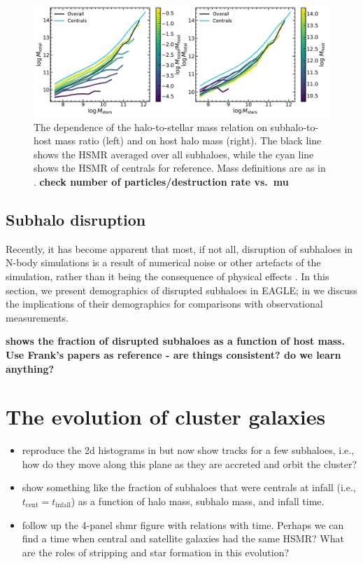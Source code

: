 \documentclass[usenatbib,fleqn]{mnras}
\newcommand{\comment}[1]{\textbf{\color{magenta} #1}}
\newcommand{\eagle}{EAGLE}
\newcommand{\tcent}{t_\mathrm{cent}}
\newcommand{\tinfall}{t_\mathrm{infall}}
\begin{document}
\begin{figure}
  \centerline{\includegraphics[width=\linewidth]{shmr_mu.pdf}}
  \caption{The dependence of the halo-to-stellar mass relation on subhalo-to-host mass ratio (left) and on host halo mass (right). The black line shows the HSMR averaged over all subhaloes, while the cyan line shows the HSMR of centrals for reference. Mass definitions are as in . \comment{check number of particles/destruction rate vs.\ mu}}
  \label{f:shmr_mu}
\end{figure}


\subsection{Subhalo disruption}

Recently, it has become apparent that most, if not all, disruption of subhaloes in N-body  simulations is a result of numerical noise or other artefacts of the simulation, rather than it being the consequence of physical effects \citep{vdbosch18_analytic,vdbosch18_nbody}. In this section, we present demographics of disrupted subhaloes in \eagle; in  we discuss the implications of their demographics for comparisons with observational measurements.

\comment{ shows the fraction of disrupted subhaloes as a function of host mass. Use Frank's papers as reference - are things consistent? do we learn anything?}


\section{The evolution of cluster galaxies}

\begin{itemize}
  \item reproduce the 2d histograms in  but now show tracks for a few subhaloes, i.e., how do they move along this plane as they are accreted and orbit the cluster?
  \item show something like the fraction of subhaloes that were centrals at infall (i.e., $\tcent = \tinfall$) as a function of halo mass, subhalo mass, and infall time.
  \item follow up the 4-panel shmr figure with relations with time. Perhaps we can find a time when central and satellite galaxies had the same HSMR? What are the roles of stripping and star formation in this evolution?
\end{itemize}
\end{document}
